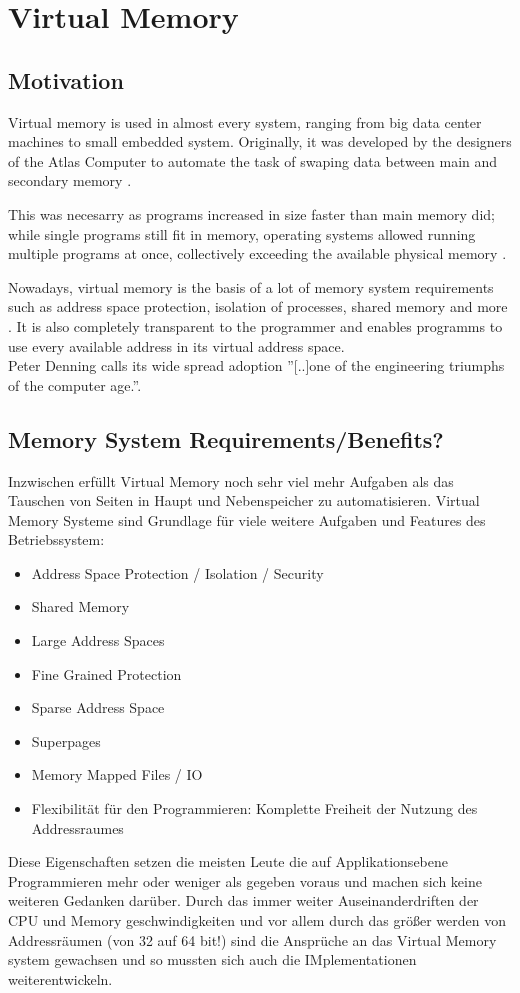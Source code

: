\section{Virtual Memory}
\subsection{Motivation}
Virtual memory is used in almost every system, ranging from big data center machines to small embedded system.
Originally, it was developed by the designers of the Atlas Computer to automate the task of swaping data between
main and secondary memory \cite{denning1997before}.

This was necesarry as programs increased in size faster than main memory did; while single programs
still fit in memory, operating systems allowed running multiple programs at once, collectively exceeding
the available physical memory \cite{tanenbaumOS}.

Nowadays, virtual memory is the basis of a lot of memory system requirements such as address
space protection, isolation of processes, shared memory and more \cite{jacobSoftwaremanagedAddressTranslation1997}.
It is also completely transparent to the programmer and enables programms to use every available
address in its virtual address space\cite{jacob1998look}.\\

Peter Denning calls its wide spread adoption ''[..]one of the engineering triumphs of the computer
age.''\cite{denning1997before}.
\subsection{Memory System Requirements/Benefits?}
Inzwischen erfüllt Virtual Memory noch sehr viel mehr Aufgaben als das Tauschen von Seiten in
Haupt und Nebenspeicher zu automatisieren. Virtual Memory Systeme sind Grundlage für
viele weitere Aufgaben und Features des Betriebssystem\cite{jacobSoftwaremanagedAddressTranslation1997}:
\begin{itemize}
    \item Address Space Protection / Isolation / Security
    \item Shared Memory
    \item Large Address Spaces
    \item Fine Grained Protection
    \item Sparse Address Space
    \item Superpages
    \item Memory Mapped Files / IO \cite{tanenbaumOS}
    \item Flexibilität für den Programmieren: Komplette Freiheit der Nutzung des Addressraumes
\end{itemize}
Diese Eigenschaften setzen die meisten Leute die auf Applikationsebene Programmieren mehr oder
weniger als gegeben voraus und machen sich keine weiteren Gedanken darüber.
Durch das immer weiter Auseinanderdriften der CPU und Memory geschwindigkeiten und vor allem
durch das größer werden von Addressräumen (von 32 auf 64 bit!)  sind die Ansprüche an
das Virtual Memory system gewachsen und so mussten sich auch die IMplementationen weiterentwickeln.

